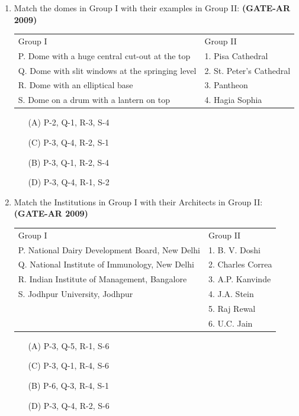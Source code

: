 \documentclass[a4paper,10pt]{article}
\begin{document}
\begin{enumerate}
    \item Match the domes in Group I with their examples in Group II: \hfill \textbf{(GATE-AR 2009)} \\
    \begin{tabular}{ p p }
	Group I & Group II \\
	P. Dome with a huge central cut-out at the top & 1. Pisa Cathedral \\
	Q. Dome with slit windows at the springing level & 2. St. Peter’s Cathedral \\
	R. Dome with an elliptical base & 3. Pantheon \\
	S. Dome on a drum with a lantern on top & 4. Hagia Sophia \\
	\end{tabular}
	\begin{multicols}{2}
	\begin{itemize}
        \item[(A)] P-2, Q-1, R-3, S-4
        \item[(C)] P-3, Q-4, R-2, S-1
        \item[(B)] P-3, Q-1, R-2, S-4
        \item[(D)] P-3, Q-4, R-1, S-2
    \end{itemize}
	\end{multicols}

    \item Match the Institutions in Group I with their Architects in Group II: \hfill \textbf{(GATE-AR 2009)} \\
    \begin{tabular}{ p p }
	Group I & Group II \\
	P. National Dairy Development Board, New Delhi & 1. B. V. Doshi \\
	Q. National Institute of Immunology, New Delhi & 2. Charles Correa \\
	R. Indian Institute of Management, Bangalore & 3. A.P. Kanvinde \\
	S. Jodhpur University, Jodhpur & 4. J.A. Stein \\
	& 5. Raj Rewal \\
	& 6. U.C. Jain \\
	\end{tabular}
	\begin{multicols}{2}
	\begin{itemize}
        \item[(A)] P-3, Q-5, R-1, S-6
        \item[(C)] P-3, Q-1, R-4, S-6
        \item[(B)] P-6, Q-3, R-4, S-1
        \item[(D)] P-3, Q-4, R-2, S-6
    \end{itemize}
	\end{multicols}


\end{enumerate}
\end{document}
